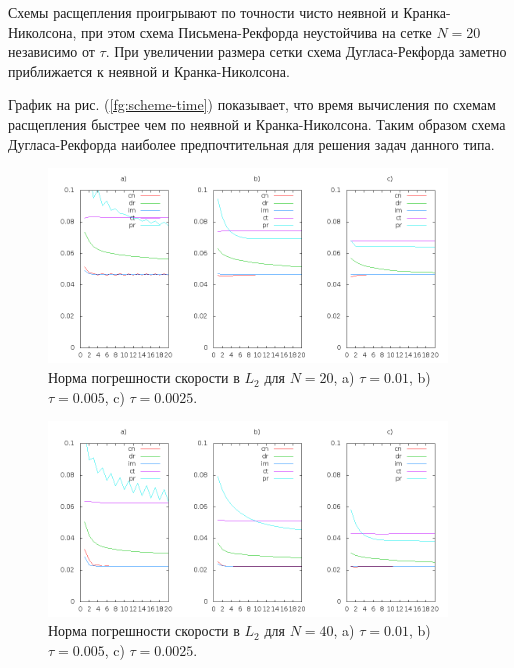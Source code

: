 \documentclass[12pt]{article}
\begin{document}
Схемы расщепления проигрывают по точности чисто неявной и Кранка-Николсона, при этом  схема Письмена-Рекфорда неустойчива на сетке $N=20$ независимо от $\tau$. При увеличении размера сетки схема Дугласа-Рекфорда заметно приближается к неявной и Кранка-Николсона.

График на рис. (\ref{fg:scheme-time}) показывает, что время вычисления по схемам расщепления быстрее чем по неявной и Кранка-Николсона. Таким образом схема Дугласа-Рекфорда наиболее предпочтительная для решения задач данного типа.

\begin{figure}
	\begin{center}
		\includegraphics[width=400px]{data160/error_1}
		\caption{Норма погрешности скорости в $L_2$ для $N=20$, a) $\tau=0.01$, b) $\tau=0.005$, c) $\tau=0.0025$.}
		\label{fg:scheme-L2-1}
	\end{center}
\end{figure}

\begin{figure}
	\begin{center}
		\includegraphics[width=400px]{data160/error_2}
		\caption{Норма погрешности скорости в $L_2$ для $N=40$, a) $\tau=0.01$, b) $\tau=0.005$, c) $\tau=0.0025$.}
		\label{fg:scheme-L2-2}
	\end{center}
\end{figure}
\end{document}
